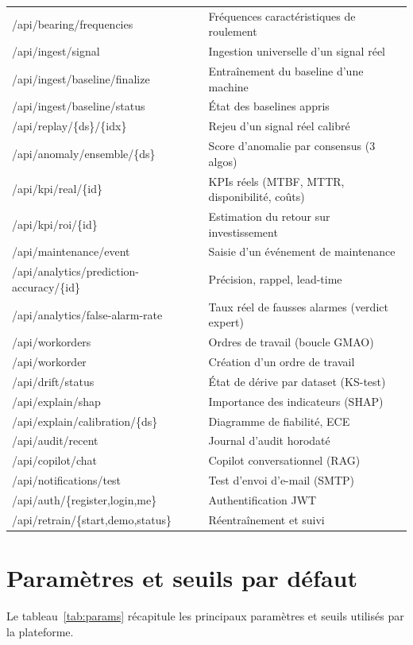 \begin{longtable}{>{\ttfamily\footnotesize}l >{\footnotesize}p{8.5cm}}
/api/bearing/frequencies & Fréquences caractéristiques de roulement \\
/api/ingest/signal & Ingestion universelle d'un signal réel \\
/api/ingest/baseline/finalize & Entraînement du baseline d'une machine \\
/api/ingest/baseline/status & État des baselines appris \\
/api/replay/\{ds\}/\{idx\} & Rejeu d'un signal réel calibré \\
/api/anomaly/ensemble/\{ds\} & Score d'anomalie par consensus (3 algos) \\
/api/kpi/real/\{id\} & KPIs réels (MTBF, MTTR, disponibilité, coûts) \\
/api/kpi/roi/\{id\} & Estimation du retour sur investissement \\
/api/maintenance/event & Saisie d'un événement de maintenance \\
/api/analytics/prediction-accuracy/\{id\} & Précision, rappel, lead-time \\
/api/analytics/false-alarm-rate & Taux réel de fausses alarmes (verdict expert) \\
/api/workorders & Ordres de travail (boucle GMAO) \\
/api/workorder & Création d'un ordre de travail \\
/api/drift/status & État de dérive par dataset (KS-test) \\
/api/explain/shap & Importance des indicateurs (SHAP) \\
/api/explain/calibration/\{ds\} & Diagramme de fiabilité, ECE \\
/api/audit/recent & Journal d'audit horodaté \\
/api/copilot/chat & Copilot conversationnel (RAG) \\
/api/notifications/test & Test d'envoi d'e-mail (SMTP) \\
/api/auth/\{register,login,me\} & Authentification JWT \\
/api/retrain/\{start,demo,status\} & Réentraînement et suivi \\
\end{longtable}

\section{Paramètres et seuils par défaut}
Le tableau~\ref{tab:params} récapitule les principaux paramètres et seuils utilisés par la
plateforme.

